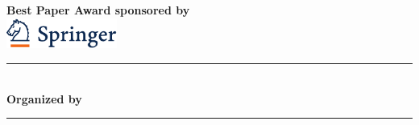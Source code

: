 \begin{center}
\hspace{\separationwidth}
\hspace{\separationwidth}



\vspace{7mm}
\textsf{\textbf{ Best Paper Award sponsored by}}\\
\vspace{3mm}
\includegraphics[height=1cm]{local_img/sponsors/Springer_cmyk}
\\

\rule{12cm}{1pt}\\[10pt]
\textsf{\textbf{Organized by }}
\hspace{2mm}

\vfill
\rule{12cm}{1pt}\\[10pt]
\end{center}
